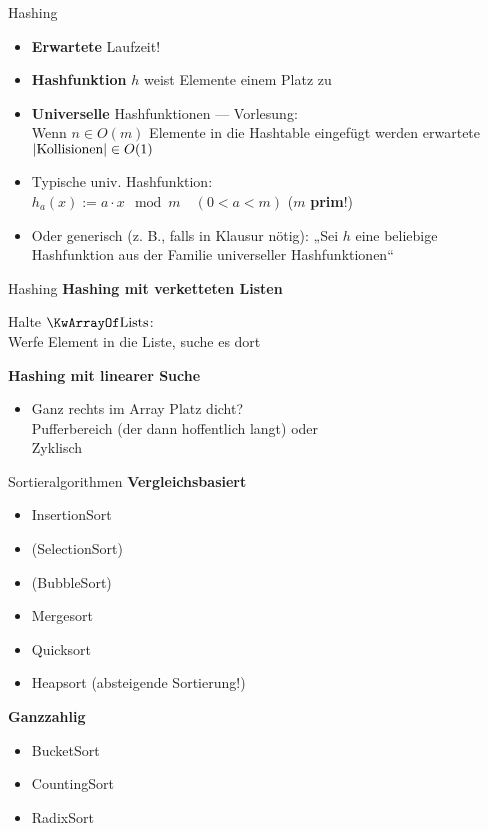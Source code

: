 \begin{frame}{Hashing}
	\begin{itemize}
		\item \textbf{Erwartete} Laufzeit!
		\item \textbf{Hashfunktion} $h$ weist Elemente einem Platz zu 
		\item \textbf{Universelle} Hashfunktionen \quad --- \quad  Vorlesung: \\
		Wenn $n \in O(m)$ Elemente in die Hashtable eingefügt werden \impl erwartete $\left| \text{Kollisionen} \right| \in O(1)$ 
		\item Typische univ. Hashfunktion: \\
		$h_a(x) := a \cdot x \mod m \quad (0 < a < m)$ \quad ($m$ \textbf{prim}!)
		\item Oder generisch (z. B., falls in Klausur nötig): „Sei $h$ eine beliebige Hashfunktion aus der Familie universeller Hashfunktionen“
	\end{itemize}
\end{frame}	

\begin{frame}{Hashing}	
	\textbf{Hashing mit verketteten Listen}
	\begin{itemize}
		\implitem Halte $\KwArrayOf \text{Lists}$: \\ 
		Werfe Element in die Liste, suche es dort
	\end{itemize}
	\pause
	\textbf{Hashing mit linearer Suche}
	\begin{itemize}
		\implitem Nur $\KwArrayOf \text{Element}$: \\
		Platz besetzt? Gucke rechts davon. \\
		Beim \textbf{Löschen}: Ggfs. wieder nach links zurückschieben!
		\item Ganz rechts im Array Platz dicht? \\
		\impl Pufferbereich (der dann hoffentlich langt)  \quad oder \\
		\impl Zyklisch 
	\end{itemize}
\end{frame}
	



\begin{frame}{Sortieralgorithmen}
	\textbf{Vergleichsbasiert}
	\begin{itemize}
		\item InsertionSort
		\item (SelectionSort)
		\item (BubbleSort)
		\item Mergesort
		\item Quicksort
		\item Heapsort (absteigende Sortierung!)
	\end{itemize}
	\textbf{Ganzzahlig}
	\begin{itemize}
		\item BucketSort
		\item CountingSort
		\item RadixSort
	\end{itemize}
\end{frame}

